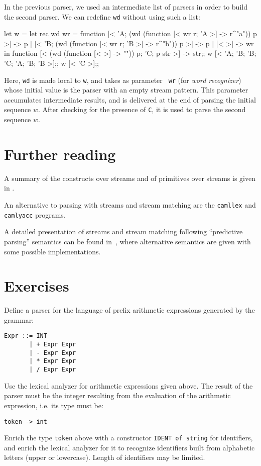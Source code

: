 In the previous parser, we used an intermediate list of parsers in
order to build the second parser. We can redefine {\tt wd} without
using such a list:
\begin{caml_example}
let w =
    let rec wd wr = function
        [< 'A; (wd (function [< wr r; 'A >] -> r^"a")) p >] -> p
      | [< 'B; (wd (function [< wr r; 'B >] -> r^"b")) p >] -> p
      | [< >] -> wr
    in function [< (wd (function [< >] -> "")) p; 'C; p str >] -> str;;
w [< 'A; 'B; 'B; 'C; 'A; 'B; 'B >];;
w [< 'C >];;
\end{caml_example}
Here, {\tt wd} is made local to {\tt w}, and takes as parameter {\tt
wr} (for {\em word recognizer}) whose initial value is the parser with
an empty stream pattern.  This parameter accumulates intermediate
results, and is delivered at the end of parsing the initial sequence
$w$. After checking for the presence of {\tt C}, it is used to parse
the second sequence $w$.

\section{Further reading}

A summary of the constructs over streams and of primitives over
streams is given in \cite{CamlLightDoc}.

An alternative to parsing with streams and stream matching are the
{\tt camllex} and {\tt camlyacc} programs.

A detailed presentation of streams and stream matching following
``predictive parsing'' semantics can be found
in~\cite{MaunydeRauglaudre92a}, where alternative semantics are given
with some possible implementations.

\section*{Exercises}

\begin{exo}\label{Streams:1}
Define a parser for the language of prefix arithmetic expressions
generated by the grammar:
\begin{verbatim}
Expr ::= INT
       | + Expr Expr
       | - Expr Expr
       | * Expr Expr
       | / Expr Expr
\end{verbatim}
Use the lexical analyzer for arithmetic expressions given above. The
result of the parser must be the integer resulting from the evaluation
of the arithmetic expression, i.e. its type must be:
\begin{center}
\verb`token -> int`
\end{center}
\end{exo}

\begin{exo}\label{Streams:2}
Enrich the type {\tt token} above with a constructor {\tt IDENT
of string} for identifiers, and enrich the lexical analyzer for it to
recognize identifiers built from alphabetic letters (upper or
lowercase). Length of identifiers may be limited.
\end{exo}

